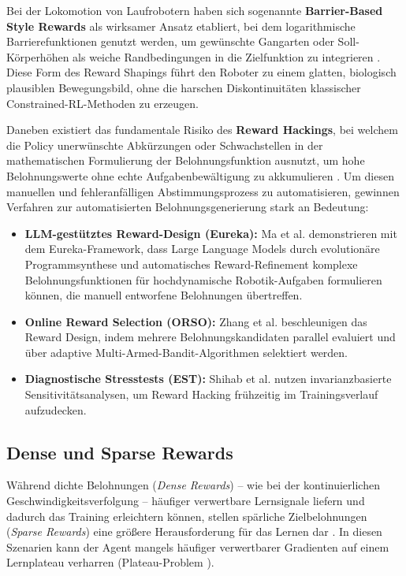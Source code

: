 Bei der Lokomotion von Laufrobotern haben sich sogenannte \textbf{Barrier-Based Style Rewards} als wirksamer Ansatz etabliert, bei dem logarithmische Barrierefunktionen genutzt werden, um gewünschte Gangarten oder Soll-Körperhöhen als weiche Randbedingungen in die Zielfunktion zu integrieren \cite{kimLearningFrameworkDiverse2025}. Diese Form des Reward Shapings führt den Roboter zu einem glatten, biologisch plausiblen Bewegungsbild, ohne die harschen Diskontinuitäten klassischer Constrained-RL-Methoden zu erzeugen.

Daneben existiert das fundamentale Risiko des \textbf{Reward Hackings}, bei welchem die Policy unerwünschte Abkürzungen oder Schwachstellen in der mathematischen Formulierung der Belohnungsfunktion ausnutzt, um hohe Belohnungswerte ohne echte Aufgabenbewältigung zu akkumulieren \cite{skalseDefiningCharacterizingReward2025}. Um diesen manuellen und fehleranfälligen Abstimmungsprozess zu automatisieren, gewinnen Verfahren zur automatisierten Belohnungsgenerierung stark an Bedeutung:
\begin{itemize}
	\item \textbf{LLM-gestütztes Reward-Design (Eureka):} Ma et al. \cite{maEurekaHumanLevelReward2023} demonstrieren mit dem Eureka-Framework, dass Large Language Models durch evolutionäre Programmsynthese und automatisches Reward-Refinement komplexe Belohnungsfunktionen für hochdynamische Robotik-Aufgaben formulieren können, die manuell entworfene Belohnungen übertreffen.
	\item \textbf{Online Reward Selection (ORSO):} Zhang et al. \cite{zhangORSOAcceleratingReward2025} beschleunigen das Reward Design, indem mehrere Belohnungskandidaten parallel evaluiert und über adaptive Multi-Armed-Bandit-Algorithmen selektiert werden.
	\item \textbf{Diagnostische Stresstests (EST):} Shihab et al. \cite{shihabDetectingProxyGaming2026} nutzen invarianzbasierte Sensitivitätsanalysen, um Reward Hacking frühzeitig im Trainingsverlauf aufzudecken.
\end{itemize}

\subsection{Dense und Sparse Rewards} \label{ss:dense_sparse_rewards}
Während dichte Belohnungen (\textit{Dense Rewards}) – wie bei der kontinuierlichen Geschwindigkeitsverfolgung – häufiger verwertbare Lernsignale liefern und dadurch das Training erleichtern können, stellen spärliche Zielbelohnungen (\textit{Sparse Rewards}) eine größere Herausforderung für das Lernen dar \cite{burda2018explorationrandomnetworkdistillation, tangDeepReinforcementLearning2024}. In diesen Szenarien kann der Agent mangels häufiger verwertbarer Gradienten auf einem Lernplateau verharren (Plateau-Problem \cite{sutton2018reinforcement}).

